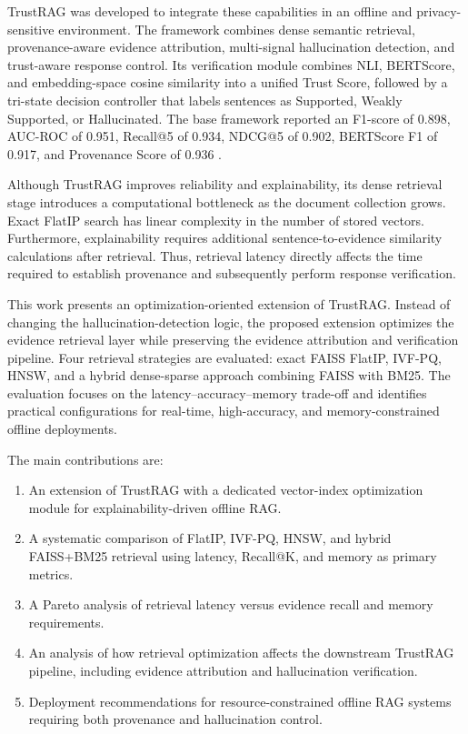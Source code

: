 \documentclass[conference]{IEEEtran}
\begin{document}
TrustRAG was developed to integrate these capabilities in an offline and privacy-sensitive environment. The framework combines dense semantic retrieval, provenance-aware evidence attribution, multi-signal hallucination detection, and trust-aware response control. Its verification module combines NLI, BERTScore, and embedding-space cosine similarity into a unified Trust Score, followed by a tri-state decision controller that labels sentences as Supported, Weakly Supported, or Hallucinated. The base framework reported an F1-score of 0.898, AUC-ROC of 0.951, Recall@5 of 0.934, NDCG@5 of 0.902, BERTScore F1 of 0.917, and Provenance Score of 0.936 \cite{trustragbase}.

Although TrustRAG improves reliability and explainability, its dense retrieval stage introduces a computational bottleneck as the document collection grows. Exact FlatIP search has linear complexity in the number of stored vectors. Furthermore, explainability requires additional sentence-to-evidence similarity calculations after retrieval. Thus, retrieval latency directly affects the time required to establish provenance and subsequently perform response verification.

This work presents an optimization-oriented extension of TrustRAG. Instead of changing the hallucination-detection logic, the proposed extension optimizes the evidence retrieval layer while preserving the evidence attribution and verification pipeline. Four retrieval strategies are evaluated: exact FAISS FlatIP, IVF-PQ, HNSW, and a hybrid dense-sparse approach combining FAISS with BM25. The evaluation focuses on the latency--accuracy--memory trade-off and identifies practical configurations for real-time, high-accuracy, and memory-constrained offline deployments.

The main contributions are:
\begin{enumerate}
    \item An extension of TrustRAG with a dedicated vector-index optimization module for explainability-driven offline RAG.
    \item A systematic comparison of FlatIP, IVF-PQ, HNSW, and hybrid FAISS+BM25 retrieval using latency, Recall@K, and memory as primary metrics.
    \item A Pareto analysis of retrieval latency versus evidence recall and memory requirements.
    \item An analysis of how retrieval optimization affects the downstream TrustRAG pipeline, including evidence attribution and hallucination verification.
    \item Deployment recommendations for resource-constrained offline RAG systems requiring both provenance and hallucination control.
\end{enumerate}
\end{document}
